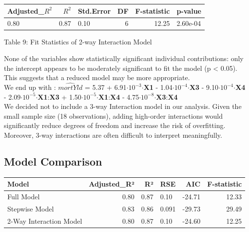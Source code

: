 \documentclass[
  12pt,
]{article}
\begin{document}
\begin{table}[!h]
\centering\begingroup\fontsize{8}{10}\selectfont

\begin{tabular}{lrlrrl}
\toprule
Adjusted\_$R^{2}$ & $R^2$ & Std.Error & DF & F-statistic & p-value\\
\midrule
0.80 & 0.87 & 0.10 & 6 & 12.25 & 2.60e-04\\
\bottomrule
\end{tabular}
\endgroup{}
\end{table}
\vspace{1em}
\begin{center}
{\fontsize{12}{14}\selectfont Table 9: Fit Statistics of 2-way Interaction Model}
\end{center}
\addtocounter{table}{2}

None of the variables show statistically significant individual
contributions: only the intercept appears to be moderately significant
to fit the model (p \textless{} 0.05). This suggests that a reduced
model may be more appropriate.\\
We end up with : \(\hat{mortYld}\) = 5.37 +
6.91\(\cdot\)\(10^{-3}\)\(\cdot\)\textbf{X1} -
1.04\(\cdot\)\(10^{-4}\)\(\cdot\)\textbf{X3} -
9.10\(\cdot\)\(10^{-4}\)\(\cdot\)\textbf{X4} -
2.09\(\cdot\)\(10^{-5}\)\(\cdot\)\textbf{X1}:\textbf{X3} +
1.50\(\cdot\)\(10^{-5}\)\(\cdot\)\textbf{X1}:\textbf{X4} -
4.75\(\cdot\)\(10^{-8}\)\(\cdot\)\textbf{X3}:\textbf{X4}\\

We decided not to include a 3-way Interaction model in our analysis.
Given the small sample size (18 observations), adding high-order
interactions would significantly reduce degrees of freedom and increase
the risk of overfitting. Moreover, 3-way interactions are often
difficult to interpret meaningfully. \vspace{-1em}

\subsection{Model Comparison}\label{model-comparison}

\begingroup\fontsize{8}{10}\selectfont

\begin{longtable}[t]{lrrlrr}
\toprule
Model & Adjusted\_R² & R² & RSE & AIC & F-statistic\\
\midrule
Full Model & 0.80 & 0.87 & 0.10 & -24.71 & 12.33\\
Stepwise Model & 0.83 & 0.86 & 0.091 & -29.73 & 29.49\\
2-Way Interaction Model & 0.80 & 0.87 & 0.10 & -24.60 & 12.25\\
\bottomrule
\end{longtable}
\endgroup{}
\end{document}
